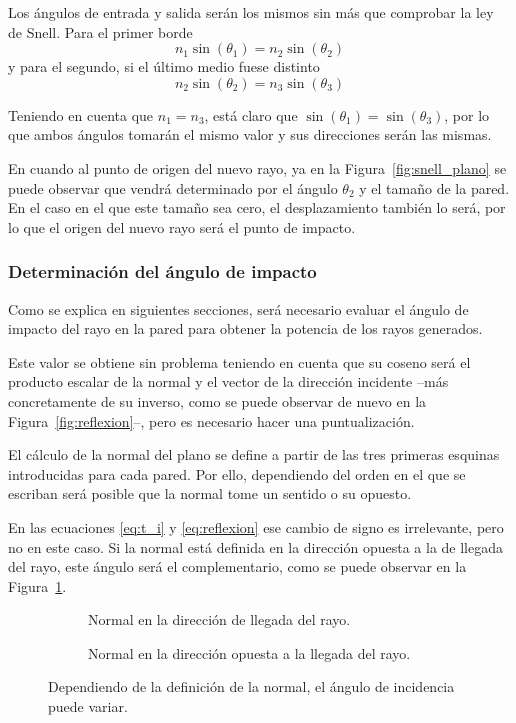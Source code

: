 Los ángulos de entrada y salida serán los mismos sin más que comprobar la ley de Snell.
Para el primer borde
\begin{equation}
    n_1\sin(\theta_1) = n_2\sin(\theta_2)
\end{equation}
y para el segundo, si el último medio fuese distinto
\begin{equation}
    n_2\sin(\theta_2) = n_3\sin(\theta_3)
\end{equation}

Teniendo en cuenta que $n_1=n_3$, está claro que $\sin(\theta_1)=\sin(\theta_3)$, por lo que ambos ángulos tomarán el mismo valor y sus direcciones serán las mismas.

En cuando al punto de origen del nuevo rayo, ya en la Figura~\ref{fig:snell_plano} se puede observar que vendrá determinado por el ángulo $\theta_2$ y el tamaño de la pared.
En el caso en el que este tamaño sea cero, el desplazamiento también lo será, por lo que el origen del nuevo rayo será el punto de impacto.

\subsubsection*{Determinación del ángulo de impacto}

Como se explica en siguientes secciones, será necesario evaluar el ángulo de impacto del rayo en la pared para obtener la potencia de los rayos generados.

Este valor se obtiene sin problema teniendo en cuenta que su coseno será el producto escalar de la normal y el vector de la dirección incidente --más concretamente de su inverso, como se puede observar de nuevo en la Figura~\ref{fig:reflexion}--, pero es necesario hacer una puntualización.

El cálculo de la normal del plano se define a partir de las tres primeras esquinas introducidas para cada pared.
Por ello, dependiendo del orden en el que se escriban será posible que la normal tome un sentido o su opuesto.

En las ecuaciones \eqref{eq:t_i} y \eqref{eq:reflexion} ese cambio de signo es irrelevante, pero no en este caso.
Si la normal está definida en la dirección opuesta a la de llegada del rayo, este ángulo será el complementario, como se puede observar en la Figura~\ref{fig:angulo_incidencia}.
\begin{figure}[H]
    \centering
    \begin{subfigure}[b]{0.4\textwidth}
        \centering
        
        \caption{Normal en la dirección de llegada del rayo.}
    \end{subfigure}
    \hspace*{10pt}
    \begin{subfigure}[b]{0.4\textwidth}
        \centering
        
        \caption{Normal en la dirección opuesta a la llegada del rayo.}
    \end{subfigure}
    \caption{Dependiendo de la definición de la normal, el ángulo de incidencia puede variar.}
    \label{fig:angulo_incidencia}
\end{figure}

